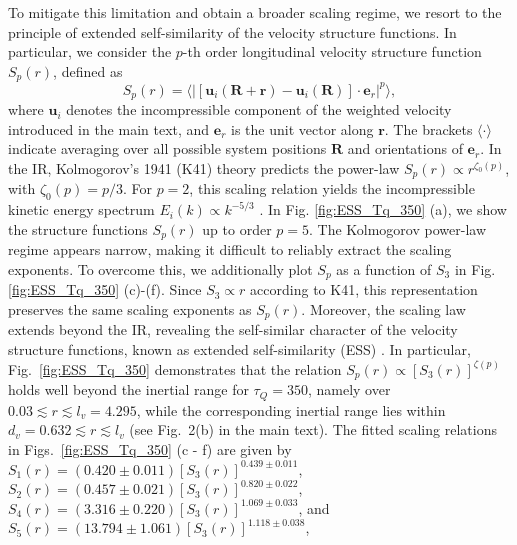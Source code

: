 \documentclass[aps,prl,twocolumn,showpacs,notitlepage,floatfix,superscriptaddress]{revtex4-1}
\begin{document}
To mitigate this limitation and obtain a broader scaling regime, we resort to the principle of extended self-similarity of the velocity structure functions.
In particular, we consider the $p$-th order longitudinal velocity structure function $S_p \left( r \right)$, defined as
\begin{equation}
S_{p}(r) = \Big\langle \big\vert[\boldsymbol{u}_{i}(\boldsymbol{R}+\boldsymbol{r}) - \boldsymbol{u}_{i}(\boldsymbol{R})]\cdot
\boldsymbol{e}_r
\big\vert^{p} \Big\rangle,
\end{equation}
where $\boldsymbol{u}_{i}$ denotes the incompressible component of the weighted velocity introduced in the main text, and
$\boldsymbol{e}_r$
is the unit vector along $\boldsymbol{r}$. The brackets $\langle \cdot \rangle$ indicate averaging over all possible system positions $\boldsymbol{R}$ and orientations of
$\boldsymbol{e}_r$.
In the IR, Kolmogorov's 1941 (K41) theory predicts the power-law
\(
S_p(r) \propto r^{
\zeta_0 \left( p \right)
}
\), with $
\zeta_0 \left( p \right)
=p/3
$. For \(p = 2\), this scaling relation yields the incompressible kinetic energy spectrum \(E_i(k) \propto k^{-5/3}\) \cite{Kolmogorov41,Benzi1993,Dubrulle1994,Frisch1995}.
In Fig. \ref{fig:ESS_Tq_350} (a), we show the structure functions $S_{p}(r)$ up to order $p=5$. The Kolmogorov power-law regime appears narrow, making it difficult to reliably extract the scaling exponents. To overcome this, we additionally plot $S_{p}$ as a function of $S_{3}$ in Fig. \ref{fig:ESS_Tq_350} (c)-(f). Since $S_{3}\propto r$ according to K41, this representation preserves the same scaling exponents as $S_{p}(r)$.
Moreover, the scaling law extends beyond the IR, revealing the self-similar character of the velocity structure functions, known as extended self-similarity (ESS) \cite{Benzi1993}.
In particular, Fig.~\ref{fig:ESS_Tq_350} demonstrates that the relation $S_p(r) \propto [S_3(r)]^{\zeta(p)}$ holds well beyond the inertial range for $\tau_Q = 350$, namely over $0.03 \lesssim r \lesssim l_v = 4.295$, while the corresponding inertial range lies within $d_v = 0.632 \lesssim r \lesssim l_v$ (see Fig.~2(b) in the main text). The fitted scaling relations in Figs.~\ref{fig:ESS_Tq_350} (c - f) are given by
$S_1(r) = \left( 0.420 \pm 0.011 \right) \left\lbrack S_3(r) \right\rbrack^{0.439 \pm 0.011}$,
$S_2(r) = \left( 0.457 \pm 0.021 \right) \left\lbrack S_3(r) \right\rbrack^{0.820 \pm 0.022}$,
$S_4(r) = \left( 3.316 \pm 0.220 \right) \left\lbrack S_3(r) \right\rbrack^{1.069 \pm 0.033}$,
and
$S_5(r) = \left( 13.794 \pm 1.061 \right) \left\lbrack S_3(r) \right\rbrack^{1.118 \pm 0.038}$,
\end{document}
